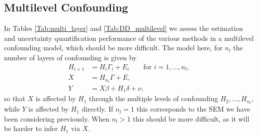 \documentclass[11pt]{article}
\numberwithin{equation}{section}
\begin{document}
\subsection{Multilevel Confounding}
In Tables \ref{Tab:multi_layer} and \ref{Tab:DD_multilevel} we assess the estimation and uncertainty quantification performance of the various methods in a multilevel confounding model, which should be more difficult. The model here, for $n_l$ the number of layers of confounding is given by
\begin{align*}
	H_{i+1} &= H_i \Gamma_i + E_i \qquad \textrm{for } i = 1,\dots, n_l, \\
	X &= H_{n_l} \Gamma + E,\\
	Y &= X\beta + H_1 \delta + \nu,
\end{align*}
so that $X$ is affected by $H_1$ through the multiple levels of confounding $H_2, \dots, H_{n_l}$, while $Y$ is affected by $H_1$ directly. If $n_l = 1$ this corresponds to the SEM we have been considering previously. When $n_l > 1$ this should be more difficult, as it will be harder to infer $H_1$ via $X$.
\end{document}
